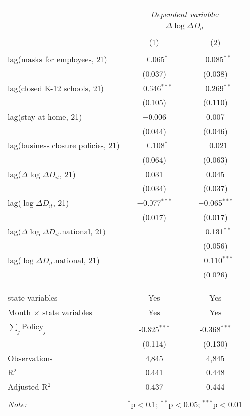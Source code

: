 \begin{tabular}{@{\extracolsep{1pt}}lcc} 
\\[-1.8ex]\hline 
\hline \\[-1.8ex] 
 & \multicolumn{2}{c}{\textit{Dependent variable:}} \\ 
\cline{2-3} 
 & \multicolumn{2}{c}{$\Delta \log \Delta D_{it}$} \\ 
\\[-1.8ex] & (1) & (2)\\ 
\hline \\[-1.8ex] 
 lag(masks for employees, 21) & $-$0.065$^{*}$ & $-$0.085$^{**}$ \\ 
  & (0.037) & (0.038) \\ 
  lag(closed K-12 schools, 21) & $-$0.646$^{***}$ & $-$0.269$^{**}$ \\ 
  & (0.105) & (0.110) \\ 
  lag(stay at home, 21) & $-$0.006 & 0.007 \\ 
  & (0.044) & (0.046) \\ 
  lag(business closure policies, 21) & $-$0.108$^{*}$ & $-$0.021 \\ 
  & (0.064) & (0.063) \\ 
  lag($\Delta \log \Delta D_{it}$, 21) & 0.031 & 0.045 \\ 
  & (0.034) & (0.037) \\ 
  lag($\log \Delta D_{it}$, 21) & $-$0.077$^{***}$ & $-$0.065$^{***}$ \\ 
  & (0.017) & (0.017) \\ 
  lag($\Delta \log \Delta D_{it}$.national, 21) &  & $-$0.131$^{**}$ \\ 
  &  & (0.056) \\ 
  lag($\log \Delta D_{it}$.national, 21) &  & $-$0.110$^{***}$ \\ 
  &  & (0.026) \\ 
   &  &  \\ 
  &  &  \\ 
 \hline \\[-1.8ex] 
state variables & Yes & Yes \\ 
Month $\times$ state variables & Yes & Yes \\ 
\hline \\[-1.8ex] 
$\sum_j \mathrm{Policy}_j$ & -0.825$^{***}$ & -0.368$^{***}$ \\ 
 & (0.114) & (0.130) \\ 
Observations & 4,845 & 4,845 \\ 
R$^{2}$ & 0.441 & 0.448 \\ 
Adjusted R$^{2}$ & 0.437 & 0.444 \\ 
\hline 
\hline \\[-1.8ex] 
\textit{Note:}  & \multicolumn{2}{r}{$^{*}$p$<$0.1; $^{**}$p$<$0.05; $^{***}$p$<$0.01} \\ 
\end{tabular} 